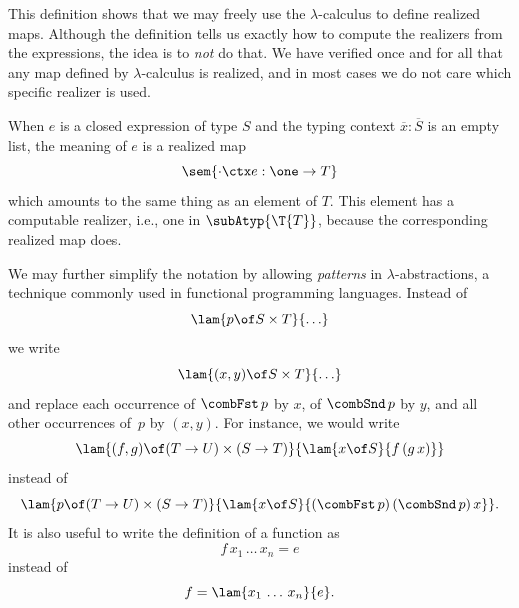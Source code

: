 %
This definition shows that we may freely use the $\lambda$-calculus to
define realized maps. Although the definition tells us exactly how to
compute the realizers from the expressions, the idea is to \emph{not}
do that. We have verified once and for all that any map defined by
$\lambda$-calculus is realized, and in most cases we do not care which
specific realizer is used.

When $e$ is a closed expression of type $S$ and the typing
context $\overline{x} : \overline{S}$ is an empty list, the
meaning of $e$ is a realized map
%
\begin{equation*}
  \sem{{\cdot} \ctx e : \one \to T}
\end{equation*}
%
which amounts to the same thing as an element of $T$. This
element has a computable realizer, i.e., one in $\subAtyp{\T{T}}$,
because the corresponding realized map does.

We may further simplify the notation by allowing \emph{patterns} in
$\lambda$-abstractions, a technique commonly used in functional
programming languages. Instead of
%
\begin{equation*}
  \lam{p \of S \times T}{\ldots}
\end{equation*}
%
we write
%
\begin{equation*}
  \lam{(x,y) \of S \times T}{\ldots}
\end{equation*}
%
and replace each occurrence of $\combFst\,p$ by $x$, of $\combSnd\,p$
by $y$, and all other occurrences of~$p$ by $(x,y)$. For instance, we
would write
%
\begin{equation*}
  \lam{(f,g) \of (T \to U) \times (S \to T)}{
    \lam{x \of S}{f\,(g\,x)}}
\end{equation*}
%
instead of
%
\begin{equation*}
  \lam{p \of (T \to U) \times (S \to T)}{
    \lam{x \of S}{(\combFst\,p)\,(\combSnd\,p)\,x}}.
\end{equation*}
%
It is also useful to write the definition of a function as
%
\begin{equation*}
  f\,x_1\,\ldots\, x_n = e
\end{equation*}
%
instead of
%
\begin{equation*}
  f = \lam{x_1\,\ldots\, x_n}{e}.
\end{equation*}

